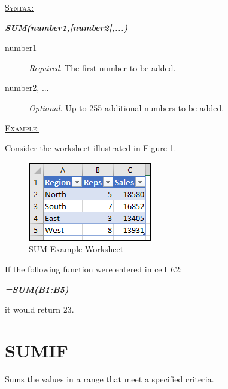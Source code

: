 \begin{addmargin}[1cm]{0cm}
	
	\medskip
	\underline{\textsc{Syntax:}}
	\medskip
	
	{\color{Syntax}
		\noindent\textbf{\textit{SUM(number1,[number2],...)}}
	}
	
	\begin{description}
		\item[number1] \textit{Required}. The first number to be added.
		\item[number2, ...] \textit{Optional}. Up to 255 additional numbers to be added.
	\end{description}

	\medskip
	\noindent\underline{\textsc{Example:}}
	\medskip
	
	\noindent Consider the worksheet illustrated in Figure \ref{apa:sum}.
	
	\begin{figure}[H]
		\centering
		\includegraphics[width=\maxwidth{.45\linewidth}]{gfx/apa_fig01}
		\caption{SUM Example Worksheet}
		\label{apa:sum}
	\end{figure}
	
	\noindent If the following function were entered in cell $ E2 $:
	
	{\color{Syntax}
		\textit{\textbf{=SUM(B1:B5)}}
	}
	
	\noindent it would return $ 23 $.

\end{addmargin}

\section{SUMIF}

Sums the values in a range that meet a specified criteria. 

